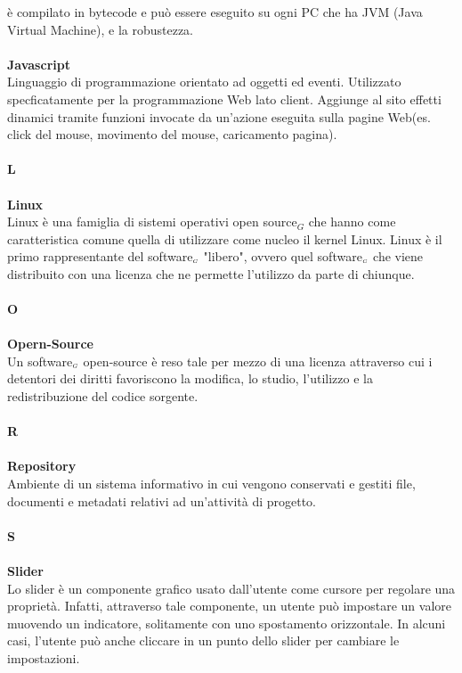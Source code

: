 è compilato in bytecode e può essere eseguito su ogni PC che ha JVM (Java Virtual Machine), e la robustezza. \\
\\
\textbf{Javascript} \\
Linguaggio di programmazione orientato ad oggetti ed eventi. Utilizzato specficatamente
per la programmazione Web lato client. Aggiunge al sito effetti dinamici tramite funzioni
invocate da un'azione eseguita sulla pagine Web(es. click del mouse, movimento del
mouse, caricamento pagina). \\
\\
\textbf{L} \\
\\
\textbf{Linux} \\
Linux è una famiglia di sistemi operativi open source$_G$ che hanno come caratteristica comune quella di utilizzare come nucleo il kernel Linux. Linux è il primo rappresentante del software$_{\scaleto{G}{3pt}}$ "libero", ovvero quel software$_{\scaleto{G}{3pt}}$ che viene distribuito con una licenza che ne permette l'utilizzo da parte di chiunque. \\
\\
\textbf{O} \\
\\
\textbf{Opern-Source} \\
Un software$_{\scaleto{G}{3pt}}$ open-source è reso tale per mezzo di una licenza attraverso cui i detentori dei
diritti favoriscono la modifica, lo studio, l'utilizzo e la redistribuzione del codice sorgente.\\
\\
\textbf{R} \\
\\
\textbf{Repository} \\
Ambiente di un sistema informativo in cui vengono conservati e gestiti file, documenti e metadati relativi ad un’attività di progetto. \\
\\
\textbf{S} \\
\\
\textbf{Slider} \\
Lo slider è un componente grafico usato dall'utente come cursore per regolare una proprietà. Infatti, attraverso tale componente, un utente può impostare un valore muovendo un indicatore, solitamente con uno spostamento orizzontale. In alcuni casi, l'utente può anche cliccare in un punto dello slider per cambiare le impostazioni.  \\
\\
